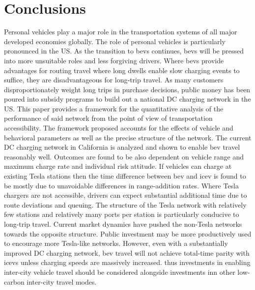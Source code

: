 \section*{Conclusions}

Personal vehicles play a major role in the transportation systems of all major developed economies globally. The role of personal vehicles is particularly pronounced in the US. As the transition to \glspl{bev} continues, \glspl{bev} will be pressed into more unsuitable roles and less forgiving drivers. Where \glspl{bev} provide advantages for routing travel where long dwells enable slow charging events to suffice, they are disadvantageous for long-trip travel. As many customers disproportionately weight long trips in purchase decisions, public money has been poured into subsidy programs to build out a national DC charging network in the US. This paper provides a framework for the quantitative analysis of the performance of said network from the point of view of transportation accessibility. The framework proposed accounts for the effects of vehicle and behavioral parameters as well as the precise structure of the network. The current DC charging network in California is analyzed and shown to enable \gls{bev} travel reasonably well. Outcomes are found to be also dependent on vehicle range and maximum charge rate and individual risk attitude. If vehicles can charge at existing Tesla stations then the time difference between \gls{bev} and \gls{icev} is found to be mostly due to unavoidable differences in range-addition rates. Where Tesla chargers are not accessible, drivers can expect substantial additional time due to route deviations and queuing. The structure of the Tesla network with relatively few stations and relatively many ports per station is particularly conducive to long-trip travel. Current market dynamics have pushed the non-Tesla networks towards the opposite structure. Public investment may be more productively used to encourage more Tesla-like networks. However, even with a substantially improved DC charging network, \gls{bev} travel will not achieve total-time parity with \glspl{icev} unless charging speeds are massively increased. thus investments in enabling inter-city vehicle travel should be considered alongside investments inn other low-carbon inter-city travel modes.